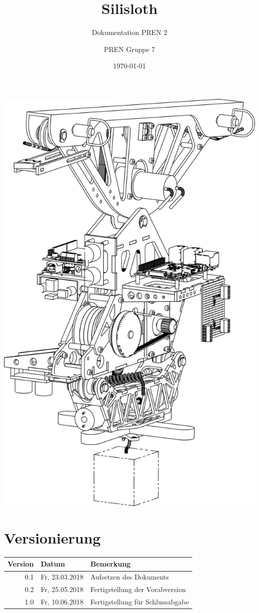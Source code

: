 \author{PREN Gruppe 7}
\title{Silisloth}
\subtitle{Dokumentation PREN 2}
\date{\today}

\begin{multicols}{2}
\maketitle
\columnbreak
    \includegraphics[width=0.75\columnwidth]{pics/assembly-schraeg.png}
\end{multicols}

\section*{Versionierung}
\def\arraystretch{1.2}
\begin{tabularx}{\textwidth}{|r|l|X|}
\hline
\textbf{Version} & \textbf{Datum} & \textbf{Bemerkung} \\
\hline
0.1 & Fr, 23.03.2018 & Aufsetzen des Dokuments \\
0.2 & Fr, 25.05.2018 & Fertigstellung der Vorabversion \\
1.0 & Fr, 10.06.2018 & Fertigstellung für Schlussabgabe \\
\hline
\end{tabularx}
\vspace{1em}

